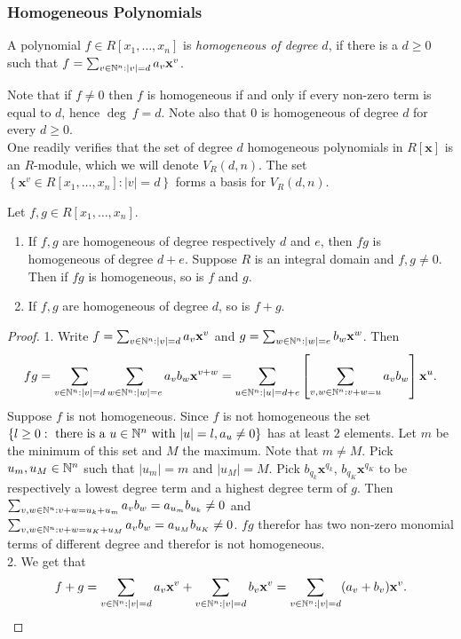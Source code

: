 \subsubsection{Homogeneous Polynomials}
\begin{definition}
    A polynomial $f\in R[x_1,\dots,x_n]$ is \textit{homogeneous of degree $d$}, if there is a $d\geq 0$ such that $f = \sum_{v\in \mathbb{N}^n: \vert v\vert =d} a_v \mathbf{x}^v$.
\end{definition}
\begin{remark}
    Note that if $f\neq0$ then $f$ is homogeneous if and only if every non-zero term is equal to $d$, hence $\deg\ f=d$. Note also that $0$ is homogeneous of degree $d$ for every $d\geq 0$.\\
    One readily verifies that the set of degree $d$ homogeneous polynomials in $R[\mathbf{x}]$ is an $R$-module, which we will denote $V_R(d,n)$. The set $\left\{\mathbf{x}^v\in R[x_1,\dots,x_n] : \vert v\vert =d\right\}$ forms a basis for $V_R(d,n)$. 
\end{remark}
\begin{lemma}\label{ProductAndSumOfHomogeneousPolynomials}
    Let $f,g\in R[x_1,\dots,x_n]$. 
    \begin{enumerate}
        \item If $f,g$ are homogeneous of degree respectively $d$ and $e$, then $fg$ is homogeneous of degree $d+e$. Suppose $R$ is an integral domain and $f,g\neq0$. Then if $fg$ is homogeneous, so is $f$ and $g$.  
        \item If $f,g$ are homogeneous of degree $d$, so is $f+g$.   
    \end{enumerate}
\end{lemma}
\begin{proof}
    1. Write $f=\sum_{v\in \mathbb{N}^n:\vert v\vert =d}a_v\mathbf{x}^v$ and $g=\sum_{w\in\mathbb{N}^n:\vert w \vert = e}b_w\mathbf{x}^w$. Then 
    $$fg=\sum_{v\in \mathbb{N}^n : \vert v\vert = d}\sum_{w\in \mathbb{N}^n : \vert w\vert =e} a_vb_w\mathbf{x}^{v+w}=\sum_{u\in \mathbb{N}^n : \vert u \vert = d+e}\left[\sum_{v,w\in \mathbb{N}^n : v+w=u} a_vb_w\right]\mathbf{x}^u.$$
    Suppose $f$ is not homogeneous. Since $f$ is not homogeneous the set $\left\{l\geq 0 : \text{ there is a } u\in \mathbb{N}^n \text{ with } \vert u\vert =  l, a_u\neq0\right\}$ has at least $2$ elements. Let $m$ be the minimum of this set and $M$ the maximum. Note that $m\neq M$. Pick $u_m,u_M\in\mathbb{N}^n$ such that $\vert u_m\vert =m$ and $\vert u_M\vert = M$. Pick $b_{q_k}\mathbf{x}^{q_k}$, $b_{q_K}\mathbf{x}^{q_K}$ to be respectively a lowest degree term and a highest degree term of $g$. Then $\sum_{v,w\in \mathbb{N}^n : v+w = u_k + u_m} a_vb_w = a_{u_m}b_{u_k}\neq 0$ and $\sum_{v,w\in \mathbb{N}^n : v+w = u_K+u_M} a_vb_w =a_{u_M}b_{u_K} \neq 0$. $fg$ therefor has two non-zero monomial terms of different degree and therefor is not homogeneous.\\    
    2. We get that 
    $$f+g=\sum_{v\in \mathbb{N}^n:\vert v\vert=d} a_v\mathbf{x}^v + \sum_{v\in \mathbb{N}^n : \vert v\vert =d} b_v\mathbf{x}^v = \sum_{v\in \mathbb{N}^n : \vert v\vert =d} (a_v+b_v)\mathbf{x}^v.$$
\end{proof}


